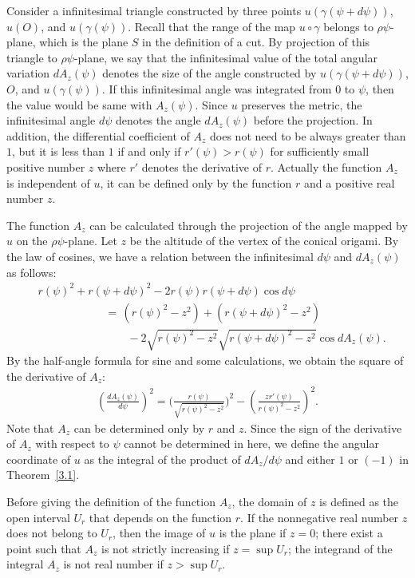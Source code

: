 \documentclass{amsart}
\theoremstyle{plain}
\theoremstyle{definition}
\theoremstyle{remark}
\begin{document}
Consider a infinitesimal triangle constructed by three points $u(\gamma(\psi+d\psi))$, $u(O)$, and $u(\gamma(\psi))$.
Recall that the range of the map $u\circ\gamma$ belongs to $\rho\psi$-plane, which is the plane $S$ in the definition of a cut.
By projection of this triangle to $\rho\psi$-plane, we say that the infinitesimal value of the total angular variation $dA_z(\psi)$ denotes the size of the angle constructed by $u(\gamma(\psi+d\psi))$, $O$, and $u(\gamma(\psi))$.
If this infinitesimal angle was integrated from $0$ to $\psi$, then the value would be same with $A_z(\psi)$.
Since $u$ preserves the metric, the infinitesimal angle $d\psi$ denotes the angle $dA_z(\psi)$ before the projection.
In addition, the differential coefficient of $A_z$ does not need to be always greater than $1$, but it is less than $1$ if and only if $r'(\psi)>r(\psi)$ for sufficiently small positive number $z$ where $r'$ denotes the derivative of $r$.
Actually the function $A_z$ is independent of $u$, it can be defined only by the function $r$ and a positive real number $z$.

The function $A_z$ can be calculated through the projection of the angle mapped by $u$ on the $\rho\psi$-plane.
Let $z$ be the altitude of the vertex of the conical origami.
By the law of cosines, we have a relation between the infinitesimal $d\psi$ and $dA_z(\psi)$ as follows:
\begin{align*}
&r(\psi)^2+r(\psi+d\psi)^2-2r(\psi)r(\psi+d\psi)\cos d\psi\,
\\&\qquad\qquad\qquad=\,\left(r(\psi)^2-z^2\right)+\left(r(\psi+d\psi)^2-z^2\right)
\\&\qquad\qquad\qquad\qquad-2\sqrt{r(\psi)^2-z^2}\sqrt{r(\psi+d\psi)^2-z^2}\cos dA_z(\psi).
\end{align*}
By the half-angle formula for sine and some calculations, we obtain the square of the derivative of $A_z$:
\begin{align*}
\left(\frac{dA_z(\psi)}{d\psi}\right)^2=\biggl(\frac{r(\psi)}{\sqrt{r(\psi)^2-z^2}}\biggr)^2-\left(\frac{zr'(\psi)}{r(\psi)^2-z^2}\right)^2.
\end{align*}
Note that $A_z$ can be determined only by $r$ and $z$.
Since the sign of the derivative of $A_z$ with respect to $\psi$ cannot be determined in here, we define the angular coordinate of $u$ as the integral of the product of $dA_z/d\psi$ and either $1$ or $(-1)$ in Theorem~\ref{3.1}.

Before giving the definition of the function $A_z$, the domain of $z$ is defined as the open interval $U_r$ that depends on the function $r$. 
If the nonnegative real number $z$ does not belong to $U_r$, then the image of $u$ is the plane if $z=0$; there exist a point such that $A_z$ is not strictly increasing if $z=\sup U_r$; the integrand of the integral $A_z$ is not real number if $z>\sup U_r$.
\end{document}
